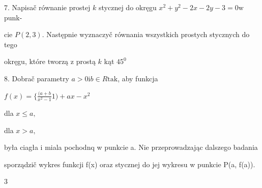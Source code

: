 \documentclass[a4paper,12pt]{article}
\begin{document}
7. Napisač równanie prostej $k$ stycznej do okręgu $x^{2}+y^{2}-2x-2y-3=0\mathrm{w}$ punk-

cie $P(2,3)$. Następnie wyznaczyč równania wszystkich prostych stycznych do tego

okręgu, które tworzą $\mathrm{z}$ prostą $k$ kąt $45^{0}$

8. Dobrač parametry $a>0\mathrm{i}b\in R\mathrm{t}\mathrm{a}\mathrm{k}$, aby funkcja

$f(x)=\displaystyle \{\frac{(a+b}{x^{2}-1}1)+ax-x^{2}$

dla $x\leq a,$

dla $x>a,$

była ciagła i miala pochodnq w punkcie a. Nie przeprowadzając dalszego badania

sporządzič wykres funkcji f(x) oraz stycznej do jej wykresu w punkcie P(a, f(a)).

3
\end{document}
